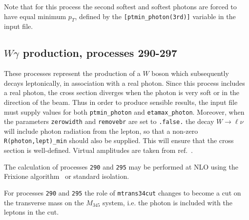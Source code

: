 \documentclass{article}
\begin{document}
{{{{{{Note that for this process the second softest and softest photons are forced to have equal minimum $p_T$, defined
by the {\tt{[ptmin\_photon(3rd)]}} variable in the input file.


\subsection{$W\gamma$ production, processes 290-297}
\label{subsec:wgamma}

These processes represent the production of a $W$ boson which subsequently
decays leptonically, in association with a real photon.
Since this process includes a real photon, the cross section diverges
when the photon is very soft or in the direction of the beam.
Thus in order to produce sensible results, the input file must supply values for both
{\tt ptmin\_photon} and {\tt etamax\_photon}. Moreover, when the parameters {\tt zerowidth}
and {\tt removebr} are set to {\tt .false.} the decay $W \to \ell \nu$ will include
photon radiation from the lepton, so that a non-zero {\tt R(photon,lept)\_min} should
also be supplied. This will ensure that the cross section is well-defined.
Virtual amplitudes are taken from ref.~\cite{Dixon:1998py}.

The calculation of processes {\tt 290} and {\tt 295} may be performed
at NLO using the Frixione algorithm~\cite{Frixione:1998jh} or standard isolation. 

For processes {\tt 290} and {\tt 295} the role of {\tt mtrans34cut} changes to become a cut 
on the transverse mass on the $M_{345}$ system, i.e. the photon is included with the leptons in the cut. 

}}}}}}
\end{document}
